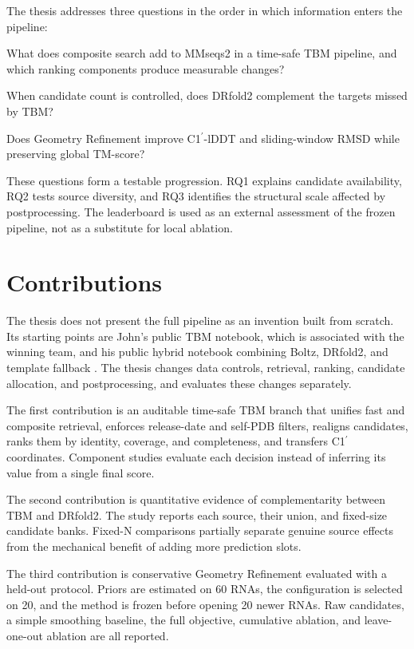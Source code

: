 \documentclass[12pt,a4paper,oneside]{report}
\newcommand{\cprime}{C1$^{\prime}$}
\begin{document}
The thesis addresses three questions in the order in which information enters the
pipeline:

\begin{description}[leftmargin=1.4cm,style=nextline]
  \item[RQ1.] What does composite search add to MMseqs2 in a time-safe TBM pipeline, and
  which ranking components produce measurable changes?
  \item[RQ2.] When candidate count is controlled, does DRfold2 complement the targets
  missed by TBM?
  \item[RQ3.] Does Geometry Refinement improve \cprime{}-lDDT and sliding-window RMSD
  while preserving global TM-score?
\end{description}

These questions form a testable progression. RQ1 explains candidate availability, RQ2
tests source diversity, and RQ3 identifies the structural scale affected by postprocessing.
The leaderboard is used as an external assessment of the frozen pipeline, not as a
substitute for local ablation.

\section{Contributions}

The thesis does not present the full pipeline as an invention built from scratch. Its
starting points are John's public TBM notebook, which is associated with the winning
team, and his public hybrid notebook combining Boltz, DRfold2, and template fallback
\cite{kaggle_top1,kaggle_hybrid}. The thesis changes data controls, retrieval, ranking,
candidate allocation, and postprocessing, and evaluates these changes separately.

The first contribution is an auditable time-safe TBM branch that unifies fast and
composite retrieval, enforces release-date and self-PDB filters, realigns candidates,
ranks them by identity, coverage, and completeness, and transfers \cprime{} coordinates.
Component studies evaluate each decision instead of inferring its value from a single
final score.

The second contribution is quantitative evidence of complementarity between TBM and
DRfold2. The study reports each source, their union, and fixed-size candidate banks.
Fixed-N comparisons partially separate genuine source effects from the mechanical
benefit of adding more prediction slots.

The third contribution is conservative Geometry Refinement evaluated with a held-out
protocol. Priors are estimated on 60 RNAs, the configuration is selected on 20, and the
method is frozen before opening 20 newer RNAs. Raw candidates, a simple smoothing
baseline, the full objective, cumulative ablation, and leave-one-out ablation are all
reported.
\end{document}
